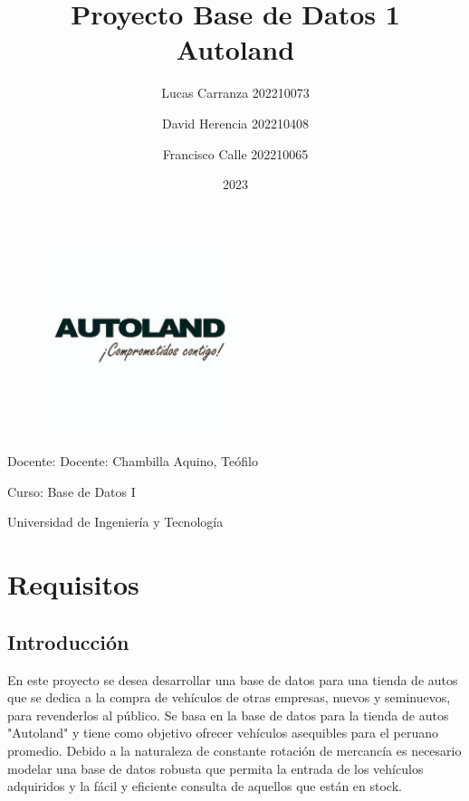 \documentclass[12pt]{article}
\begin{document}
\title{Proyecto Base de Datos 1 \\
       \large Autoland}

\author{Lucas Carranza 202210073 \and
        David Herencia 202210408 \and
        Francisco Calle 202210065}

\date{2023}
\begin{figure}
\centering
\includegraphics[width=0.5\textwidth]{autoland.jpeg}
\end{figure}


\maketitle


\begin{center} 

    \noindent Docente: Docente: Chambilla Aquino, Teófilo
    
    \noindent Curso: Base de Datos I
    
    \noindent Universidad de Ingeniería y Tecnología

\end{center}

\newpage

\tableofcontents

\newpage

\section{Requisitos}

\subsection{Introducci\'on}

En este proyecto se desea desarrollar una base de datos para una tienda de autos que se dedica a la compra de vehículos de otras empresas, nuevos y seminuevos, para revenderlos al público. Se basa en la base de datos para la tienda de autos "Autoland" y tiene como objetivo ofrecer vehículos asequibles para el peruano promedio. Debido a la naturaleza de constante rotación de mercancía es necesario modelar una base de datos robusta que permita la entrada de los vehículos adquiridos y la fácil y eficiente consulta de aquellos que están en stock. 
\end{document}
